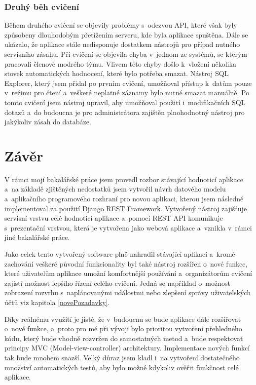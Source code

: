 \documentclass[
  digital,
  twoside,
  table, 
  nolof, 
  nolot
]{fithesis3}
\begin{document}
\subsection{Druhý běh cvičení}
Během druhého cvičení se objevily problémy s~odezvou API, které však byly způsobeny dlouhodobým přetížením serveru, kde byla aplikace spuštěna. Dále se ukázalo, že aplikace stále nedisponuje dostatkem nástrojů pro případ nutného servisního zásahu. Při cvičení se objevila chyba v~jednom ze systémů, se kterým pracovali členové modrého týmu. Vlivem této chyby došlo k~vložení několika stovek automatických hodnocení, které bylo potřeba smazat. Nástroj SQL Explorer, který jsem přidal po prvním cvičení, umožňoval přístup k~datům pouze v~režimu pro čtení a~veškeré neplatné záznamy bylo nutné smazat manuálně. Po tomto cvičení jsem nástroj upravil, aby umožňoval použití i~modifikačních SQL dotazů a~do budoucna je pro administrátora zajištěn plnohodnotný nástroj pro jakýkoliv zásah do databáze.

\chapter{Závěr}
\label{end}

V rámci mojí bakalářské práce jsem provedl rozbor stávající hodnoticí aplikace a~na základě zjištěných nedostatků jsem vytvořil návrh datového modelu a~aplikačního programového rozhraní pro novou aplikaci, kterou jsem následně implementoval za použití Django REST Framework. Vytvořený nástroj zajišťuje servisní vrstvu celé hodnoticí aplikace a~pomocí REST API komunikuje s~prezentační vrstvou, která je vytvořena jako webová aplikace a~vznikla v~rámci jiné bakalářské práce. 

Jako celek tento vytvořený software plně nahradil stávající aplikaci a~kromě zachování veškeré původní funkcionality byl také nástroj rozšířen o~nové funkce, které uživatelům aplikace umožní komfortnější používání a~organizátorům cvičení zajistí možnost lepšího řízení celého cvičení. Jedná se například o~možnost zobrazení rozvrhu s~naplánovanými událostmi nebo zlepšení správy uživatelských účtů viz kapitola \ref{novePozadavky}.

Díky reálnému využití je jisté, že v~budoucnu se bude aplikace dále rozšiřovat o~nové funkce, a~proto pro mě při vývoji bylo prioritou vytvoření přehledného kódu, který bude vhodně rozvržen do samostatných metod a~bude respektovat principy MVC (Model-view-controller) architektury. Implementace nových funkcí tak bude mnohem snazší. Velký důraz jsem kladl i~na vytvoření dostatečného množství automatických testů, aby bylo možné kdykoliv ověřit funkčnost celé aplikace.
\end{document}
